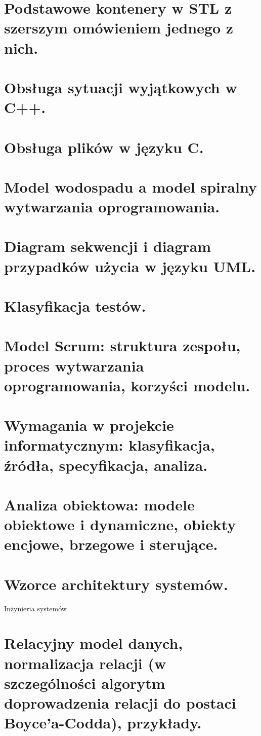 \documentclass[12pt]{article}
\begin{document}
    \section{Podstawowe kontenery w STL z szerszym omówieniem jednego z nich.}
    \section{Obsługa sytuacji wyjątkowych w C++.}
    \section{Obsługa plików w języku C.}
    \section{Model wodospadu a model spiralny wytwarzania oprogramowania.}
    \section{Diagram sekwencji i diagram przypadków użycia w języku UML.}
    \section{Klasyfikacja testów.}
    \section{Model Scrum: struktura zespołu, proces wytwarzania oprogramowania, korzyści modelu.}
    \section{Wymagania w projekcie informatycznym: klasyfikacja, źródła, specyfikacja, analiza.}
    \section{Analiza obiektowa: modele obiektowe i dynamiczne, obiekty encjowe, brzegowe i sterujące.}
    \section{Wzorce architektury systemów.}

    {\Large Inżynieria systemów}

    \section{Relacyjny model danych, normalizacja relacji (w szczególności algorytm doprowadzenia relacji do postaci Boyce’a-Codda), przykłady.}
\end{document}
